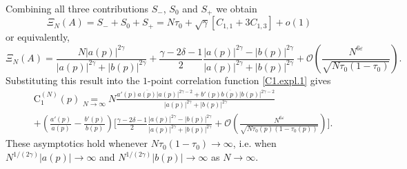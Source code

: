\documentclass[pdflatex,sn-mathphys-num]{sn-jnl}
\theoremstyle{thmstyleone}
\numberwithin{equation}{section}
\newcommand{\Cc}{\mathrm{C}}
\begin{document}
Combining all three contributions $S_{-}$, $S_0$ and $S_{+}$ we obtain
\begin{equation}
\Xi_N(A)=S_-+S_0+S_+=N\tau_0+\sqrt{\gamma}\left[C_{1,1}+3C_{1,3}\right]+o(1)
\end{equation}
or equivalently,
\begin{equation}
    \Xi_N(A)=\frac{N|a(p)|^{2\gamma}}{|a(p)|^{2\gamma}+|b(p)|^{2\gamma}}+\frac{\gamma-2\delta-1}{2}\frac{|a(p)|^{2\gamma}-|b(p)|^{2\gamma}}{|a(p)|^{2\gamma}+|b(p)|^{2\gamma}}+\mathcal{O}\left(\frac{N^{6\varepsilon}}{\sqrt{N\tau_0(1-\tau_0)}}\right).
\end{equation}
Substituting this result into the $1$-point correlation function \eqref{C1.expl.1} gives
\begin{equation}\label{C1-result.1}
\begin{split}
&\Cc_1^{(N)}(p)\underset{N\to\infty}{=}N\frac{a'(p)\overline{a(p)}|a(p)|^{2\gamma-2}+b'(p)\overline{b(p)}|b(p)|^{2\gamma-2}}{|a(p)|^{2\gamma}+|b(p)|^{2\gamma}}\\
&+\left(\frac{a'(p)}{a(p)}-\frac{b'(p)}{b(p)}\right)\biggl[\frac{\gamma-2\delta-1}{2}\frac{|a(p)|^{2\gamma}-|b(p)|^{2\gamma}}{|a(p)|^{2\gamma}+|b(p)|^{2\gamma}}+\mathcal{O}\left(\frac{N^{6\varepsilon}}{\sqrt{N\tau_0(p)(1-\tau_0(p))}}\right)\biggl].
\end{split}
\end{equation}
These asymptotics hold whenever $N\tau_0(1-\tau_0)\to\infty$, i.e. when $N^{1/(2\gamma)}|a(p)|\to\infty$ and $N^{1/(2\gamma)}|b(p)|\to\infty$ as $N\to\infty$.
\end{document}
